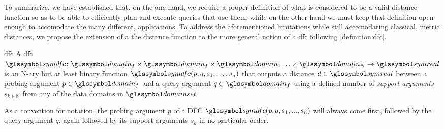 To summarize, we have established that, on the one hand, we require a proper definition of what is considered to be a valid distance function so as to be able to efficiently plan and execute queries that use them, while on the other hand we must keep that definition open enough to accomodate the many different, applications. To address the aforementioned limitations while still accomodating classical, metric distances, we propose the extension of a the distance function to the more general notion of a \acrfull{dfc} following \cref{definition:dfc}.

\begin{definition}[label=definition:dfc]{\acrlong{dfc}}{}
    A \acrshort{dfc} $\symdfc \colon \domain_f \times \domain_f \times \domain_{1} \ldots \times \domain_{N} \to \symreal$ is an N-ary but at least binary function $\symdfc(p,q,s_1,\ldots,s_n)$ that outputs a distance $d \in \symreal$ between a probing argument $p \in \domain_f$ and a query argument $q \in \domain_f$ using a defined number of \emph{support arguments} $s_{k \in \mathbb{N}}$ from any of the data domains in $\domainset$.

    As a convention for notation, the probing argument $p$ of a DFC $\symdfc(p,q,s_1,...,s_n)$ will always come first, followed by the query argument $q$, again followed by its support arguments $s_k$ in no particular order.
\end{definition}

